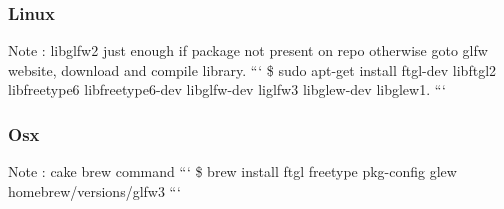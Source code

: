 \subsubsection*{Linux}

Note \-: libglfw2 just enough if package not present on repo otherwise goto glfw website, download and compile library. ``` \$ sudo apt-\/get install ftgl-\/dev libftgl2 libfreetype6 libfreetype6-\/dev libglfw-\/dev liglfw3 libglew-\/dev libglew1. ```

\subsubsection*{Osx}

Note \-: cake brew command ``` \$ brew install ftgl freetype pkg-\/config glew homebrew/versions/glfw3 ``` 